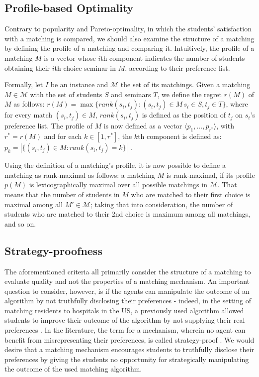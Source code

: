 \subsection{Profile-based Optimality}\label{sec:profile}
Contrary to popularity and Pareto-optimality, in which the students' satisfaction with a matching is compared, we should also examine the structure of a matching by defining the profile of a matching and comparing it. Intuitively, the profile of a matching $M$ is a vector whose $i$th component indicates the number of students obtaining their $i$th-choice seminar in $M$, according to their preference list. 

Formally, let $I$ be an instance and $\mathcal{M}$ the set of its matchings. Given a matching $M \in \mathcal{M}$ with the set of students $S$ and seminars $T$, we define the regret $r(M)$ of $M$ as follows:
$r(M) = \max \{rank(s_i, t_j): (s_i, t_j)\in M\, s_i \in S, t_j \in T\}$, where for every match $(s_i, t_j) \in M$, $rank(s_i, t_j)$ is defined as the position of $t_j$ on $s_i$'s preference list. The profile of $M$ is now defined as a vector $\langle p_1,..., p_{r^*} \rangle$, with $r^* = r(M)$ and for each $k \in [1,r^*]$, the $k$th component is defined as: $p_k=|\{(s_i, t_j) \in M: rank(s_i, t_j) = k\}|$ \cite{algorithmics}.

Using the definition of a matching's profile, it is now possible to define a matching as rank-maximal as follows: a matching $M$ is rank-maximal, if its profile $p(M)$ is lexicographically maximal over all possible matchings in $\mathcal{M}$. That means that the number of students in $M$ who are matched to their first choice is maximal among all $M' \in \mathcal{M}$; taking that into consideration, the number of students who are matched to their 2nd choice is maximum among all matchings, and so on.

\subsection{Strategy-proofness}
The aforementioned criteria all primarily consider the structure of a matching to evaluate quality and not the properties of a matching mechanism. An important question to consider, however, is if the agents can manipulate the outcome of an algorithm by not truthfully disclosing their preferences - indeed, in the setting of matching residents to hospitals in the US, a previously used algorithm allowed students to improve their outcome of the algorithm by not supplying their real preferences \cite{Gusfield}. In the literature, the term for a mechanism, wherein no agent can benefit from misrepresenting their preferences, is called strategy-proof \cite{Klaus}. We would desire that a matching mechanism encourages students to truthfully disclose their preferences by giving the students no opportunity for strategically manipulating the outcome of the used matching algorithm.

